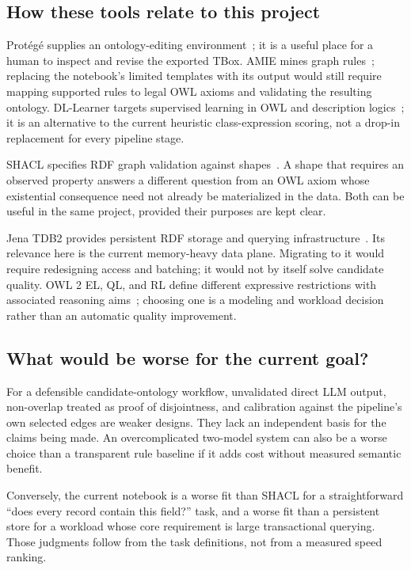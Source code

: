 \documentclass[11pt,a4paper]{article}
\begin{document}
\subsection{How these tools relate to this project}
Prot\'eg\'e supplies an ontology-editing environment~\cite{protege}; it is a useful
place for a human to inspect and revise the exported TBox. AMIE mines graph
rules~\cite{amie}; replacing the notebook's limited templates with its output
would still require mapping supported rules to legal OWL axioms and validating
the resulting ontology. DL-Learner targets supervised learning in OWL and
description logics~\cite{dllearner}; it is an alternative to the current heuristic
class-expression scoring, not a drop-in replacement for every pipeline stage.

SHACL specifies RDF graph validation against shapes~\cite{shacl}. A shape that
requires an observed property answers a different question from an OWL axiom
whose existential consequence need not already be materialized in the data.
Both can be useful in the same project, provided their purposes are kept clear.

Jena TDB2 provides persistent RDF storage and querying infrastructure~\cite{jena}.
Its relevance here is the current memory-heavy data plane. Migrating to it would
require redesigning access and batching; it would not by itself solve candidate
quality. OWL 2 EL, QL, and RL define different expressive restrictions with
associated reasoning aims~\cite{owl-profiles}; choosing one is a modeling and
workload decision rather than an automatic quality improvement.

\subsection{What would be worse for the current goal?}
For a defensible candidate-ontology workflow, unvalidated direct LLM output,
non-overlap treated as proof of disjointness, and calibration against the
pipeline's own selected edges are weaker designs. They lack an independent
basis for the claims being made. An overcomplicated two-model system can also
be a worse choice than a transparent rule baseline if it adds cost without
measured semantic benefit.

Conversely, the current notebook is a worse fit than SHACL for a straightforward
``does every record contain this field?'' task, and a worse fit than a persistent
store for a workload whose core requirement is large transactional querying.
Those judgments follow from the task definitions, not from a measured speed
ranking.
\end{document}
